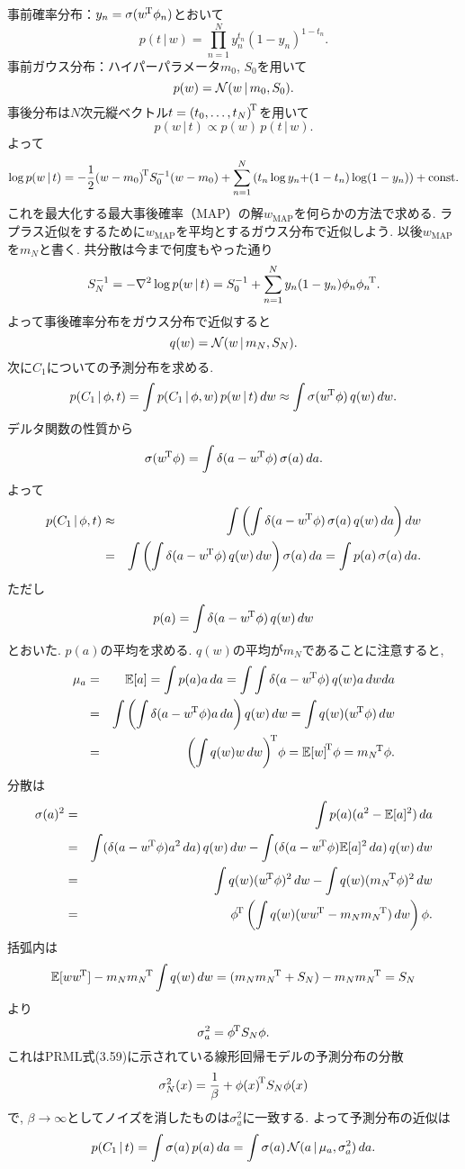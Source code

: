 事前確率分布：$y_n=\sigma({w}^{\!\mathrm{T}}\phi_n)$とおいて
$$
p(t\,|\,w)=\prod_{n=1}^N y_n^{t_n}(1-y_n)^{1-t_n}.
$$
事前ガウス分布：ハイパーパラメータ$m_0$, $S_0$を用いて
$$
p(w)={\cal N} (w\,|\,m_0, S_0).
$$
事後分布は$N$次元縦ベクトル$t={(t_0, \ldots, t_N)}^{\!\mathrm{T}}$を用いて
$$
p(w\,|\,t) \propto p(w)\,p(t\,|\,w).
$$
よって
$$
\log p(w\,|\,t)
= -\frac{1}{2}{(w-m_0)}^{\!\mathrm{T}}S_0^{-1}(w-m_0)
  +\sum_{n=1}^N \left(t_n \log y_n {+} (1-t_n)\log (1-y_n)\right) + \text{const.}
$$
これを最大化する最大事後確率（MAP）の解$w_\text{MAP}$を何らかの方法で求める.
ラプラス近似をするために$w_\text{MAP}$を平均とするガウス分布で近似しよう. 以後$w_\text{MAP}$を$m_N$と書く.
共分散は今まで何度もやった通り
$$
S_N^{-1}=-\nabla^2 \log p(w\,|\,t) = S_0^{-1} + \sum_{n=1}^N y_n(1-y_n)\phi_n {\phi_n}^{\!\mathrm{T}}.
$$
よって事後確率分布をガウス分布で近似すると
$$
q(w)={\cal N}(w\,|\,m_N, S_N).
$$
次に$C_1$についての予測分布を求める.
$$
p(C_1\,|\,\phi,t)=\int p(C_1\,|\,\phi,w)\,p(w\,|\,t)\,dw \approx \int \sigma({w}^{\!\mathrm{T}}\phi)\,q(w)\,dw.
$$
デルタ関数の性質から
$$
\sigma({w}^{\!\mathrm{T}}\phi)=\int \delta(a-{w}^{\!\mathrm{T}}\phi)\,\sigma(a)\,da.
$$
よって
\begin{eqnarray*}
p(C_1\,|\,\phi,t)
 &\approx& \int \left(\int \delta(a-{w}^{\!\mathrm{T}}\phi)\,\sigma(a)\,q(w)\,da\right) dw\\
 &=&\int \left(\int \delta(a-{w}^{\!\mathrm{T}}\phi)\,q(w)\,dw\right) \sigma(a)\,da
 =\int p(a)\,\sigma(a)\,da.
\end{eqnarray*}
ただし
$$
p(a)=\int \delta(a-{w}^{\!\mathrm{T}}\phi)\,q(w)\,dw
$$
とおいた.
$p(a)$の平均を求める. $q(w)$の平均が$m_N$であることに注意すると,
\begin{eqnarray*}
\mu_a
 &=& \mathbb{E}[a]
  =\int p(a)a\,da
  =\int \int \delta(a-{w}^{\!\mathrm{T}}\phi)\,q(w)a\,dw da\\
 &=& \int \left(\int \delta(a-{w}^{\!\mathrm{T}}\phi)a\, da\right) q(w)\,dw
  = \int q(w)({w}^{\!\mathrm{T}}\phi)\,dw\\
 &=& {\left(\int q(w)w\,dw\right)}^{\!\mathrm{T}}\phi = {\mathbb{E}[w]}^{\!\mathrm{T}}\phi = {m_N}^{\!\mathrm{T}}\phi.
\end{eqnarray*}
分散は
\begin{eqnarray*}
\sigma(a)^2 &=& \int p(a)(a^2-\mathbb{E}[a]^2)\,da \\
 &=& \int (\delta(a-{w}^{\!\mathrm{T}}\phi)a^2\,da)\,q(w)\,dw
     - \int (\delta(a-{w}^{\!\mathrm{T}}\phi)\mathbb{E}[a]^2\,da)\,q(w)\,dw\\
 &=&\int q(w)({w}^{\!\mathrm{T}}\phi)^2\,dw - \int q(w) ({m_N}^{\!\mathrm{T}}\phi)^2\,dw
 \\
 &=& {\phi}^{\!\mathrm{T}}\left( \int q(w)(w{w}^{\!\mathrm{T}}-m_N {m_N}^{\!\mathrm{T}})\,dw \right)\phi.
\end{eqnarray*}
括弧内は
$$
\mathbb{E}[w{w}^{\!\mathrm{T}}]-m_N{m_N}^{\!\mathrm{T}}\int q(w)\,dw=(m_N{m_N}^{\!\mathrm{T}}+S_N)-m_N {m_N}^{\!\mathrm{T}}=S_N
$$
より
$$
\sigma_a^2={\phi}^{\!\mathrm{T}}S_N\phi.
$$
これはPRML式(3.59)に示されている線形回帰モデルの予測分布の分散
$$
\sigma_N^2(x)=\frac{1}{\beta}+{\phi(x)}^{\!\mathrm{T}}S_N\phi(x)
$$
で, $\beta \to \infty$としてノイズを消したものは$\sigma_a^2$に一致する.
よって予測分布の近似は
$$
p(C_1\,|\,t)=\int \sigma(a)\,p(a)\,da=\int \sigma(a) \,{\cal N}(a\,|\,\mu_a,\sigma_a^2)\,da.
$$

